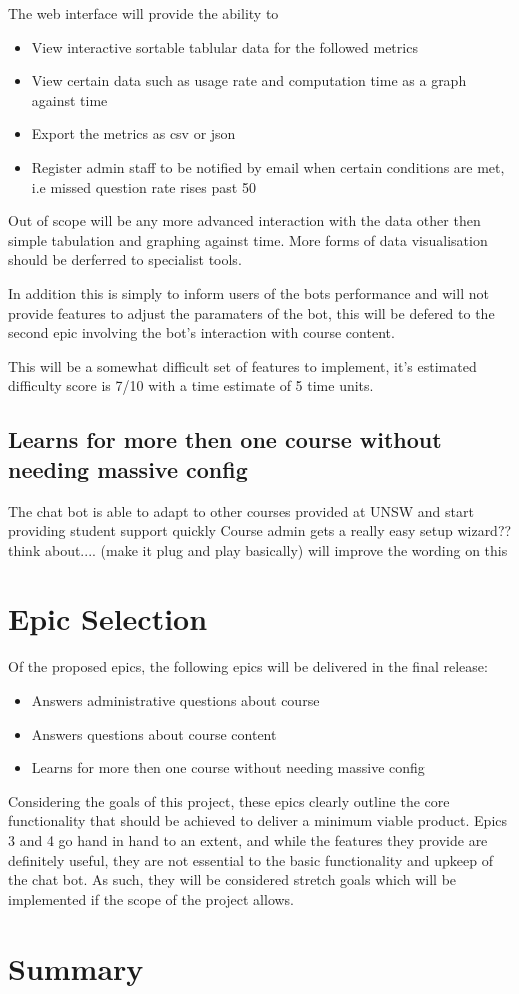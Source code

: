 \documentclass{article}
\begin{document}
The web interface will provide the ability to 
\begin{itemize}
  \item View interactive sortable tablular data for the followed metrics
  \item View certain data such as usage rate and computation time as a graph against time
  \item Export the metrics as csv or json
  \item Register admin staff to be notified by email when certain conditions are met, i.e missed question rate rises past 50%
\end{itemize}

Out of scope will be any more advanced interaction with the data other then simple tabulation and graphing against time. More forms of data visualisation should be derferred to specialist tools. 

In addition this is simply to inform users of the bots performance and will not provide features to adjust the paramaters of the bot, this will be defered to the second epic involving the bot's interaction with course content. 

This will be a somewhat difficult set of features to implement, it's estimated difficulty score is 7/10 with a time estimate of 5 time units.

\subsection{Learns for more then one course without needing massive config} %
The chat bot is able to adapt to other courses provided at UNSW and start providing student support quickly 
Course admin gets a really easy setup wizard?? think about.... 
(make it plug and play basically)   will improve the wording on this


\section{Epic Selection}
Of the proposed epics, the following epics will be delivered in the final release:
\begin{itemize}
  \item Answers administrative questions about course
  \item Answers questions about course content
  \item Learns for more then one course without needing massive config
\end{itemize}

Considering the goals of this project, these epics clearly outline the core functionality that should be achieved to deliver a minimum viable product. Epics 3 and 4 go hand in hand to an extent, and while the features they provide are definitely useful, they are not essential to the basic functionality and upkeep of the chat bot. As such, they will be considered stretch goals which will be implemented if the scope of the project allows.

\section{Summary}
\end{document}
